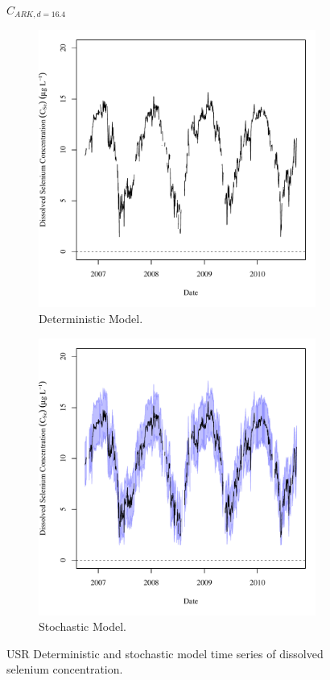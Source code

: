 \subfiguremid
\begin{landscape}
	\begin{figure}
		$ C_{ARK,d=16.4} $
		\begin{subfigure}{0.7\textwidth}
			\centering
			\includegraphics[width=\tableCustomSize]{"Figures/Results_USR/Deterministic/c TS FLS"}
			\caption{Deterministic Model.}
		\end{subfigure}%
		\begin{subfigure}{0.7\textwidth}
			\centering
			\includegraphics[width=\tableCustomSize]{"Figures/Results_USR/Stochastic/c TS FLS"}
			\caption{Stochastic Model.}
		\end{subfigure}
		\caption{USR Deterministic and stochastic model time series of dissolved selenium concentration.}
	\end{figure}
\end{landscape}


